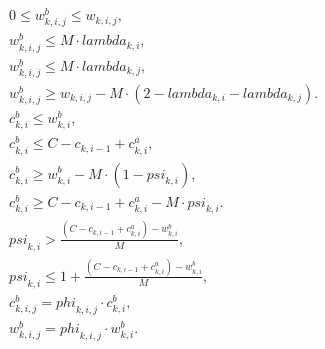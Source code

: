 \begin{align}
  & 0 \leq w_{k , i , j}^{b} \leq w_{k , i , j} , \tag{eq\_0062} \\
  & w_{k , i , j}^{b} \leq M \cdot \mathit{lambda}_{k , i} , \tag{eq\_0063} \\
  & w_{k , i , j}^{b} \leq M \cdot \mathit{lambda}_{k , j} , \tag{eq\_0064} \\
  & w_{k , i , j}^{b} \geq w_{k , i , j} - M \cdot \left(2 - \mathit{lambda}_{k , i} - \mathit{lambda}_{k , j}\right) . \tag{eq\_0065} \\
  & c_{k , i}^{b} \leq w_{k , i}^{b} , \tag{eq\_0066} \\
  & c_{k , i}^{b} \leq C - c_{k , i - 1} + c_{k , i}^{a} , \tag{eq\_0067} \\
  & c_{k , i}^{b} \geq w_{k , i}^{b} - M \cdot \left(1 - \mathit{psi}_{k , i}\right) , \tag{eq\_0068} \\
  & c_{k , i}^{b} \geq C - c_{k , i - 1} + c_{k , i}^{a} - M \cdot \mathit{psi}_{k , i} . \tag{eq\_0069} \\
  & \mathit{psi}_{k , i} > \frac{\left(C - c_{k , i - 1} + c_{k , i}^{a}\right) - w_{k , i}^{b}}{M} , \tag{eq\_0071} \\
  & \mathit{psi}_{k , i} \leq 1 + \frac{\left(C - c_{k , i - 1} + c_{k , i}^{a}\right) - w_{k , i}^{b}}{M} , \tag{eq\_0072} \\
  & c_{k , i , j}^{b} = \mathit{phi}_{k , i , j} \cdot c_{k , i}^{b} , \tag{eq\_0074} \\
  & w_{k , i , j}^{b} = \mathit{phi}_{k , i , j} \cdot w_{k , i}^{b} . \tag{eq\_0075} \\
\end{align}
